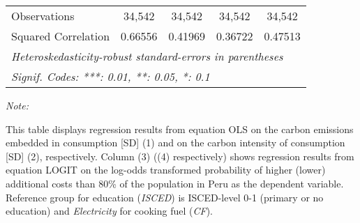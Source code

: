 \begin{table}[htbp!]
\begin{adjustbox}{width = 1\textwidth, max height = 0.95\textheight, center}
\begin{threeparttable}[b]
\begin{tabular}{lcccc}
            Observations         & 34,542             & 34,542             & 34,542        & 34,542\\  
            Squared Correlation  & 0.66556            & 0.41969            & 0.36722       & 0.47513\\  
            \midrule \midrule
            \multicolumn{5}{l}{\emph{Heteroskedasticity-robust standard-errors in parentheses}}\\
            \multicolumn{5}{l}{\emph{Signif. Codes: ***: 0.01, **: 0.05, *: 0.1}}\\
         \end{tabular}
         
         \begin{tablenotes}\item \medskip \textit{Note:}
            \item This table displays regression results from equation OLS on the carbon emissions embedded in consumption [SD] (1) and on the carbon intensity of consumption [SD] (2), respectively. 
                                      Column (3) ((4) respectively) shows regression results from equation LOGIT on the log-odds transformed probability of higher (lower) additional costs than 80\% of the population in Peru as the dependent variable. Reference group for education (\textit{ISCED}) is ISCED-level 0-1 (primary or no education) and \textit{Electricity} for cooking fuel (\textit{CF}).
         \end{tablenotes}
      \end{threeparttable}
   \end{adjustbox}
\end{table}


